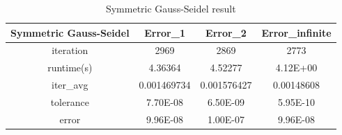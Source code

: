 \documentclass{article}
\begin{document}
\begin{table}[H]
  \centering
    \begin{tabular}{|c|c|c|c|}
    \hline
    \textbf{Symmetric Gauss-Seidel} & Error\_1 & Error\_2 & Error\_infinite \bigstrut\\
    \hline
    iteration & 2969 & 2869 & 2773 \bigstrut\\
    \hline
    runtime(s) & 4.36364 & 4.52277 & 4.12E+00 \bigstrut\\
    \hline
    iter\_avg & 0.001469734 & 0.001576427 & 0.00148608 \bigstrut\\
    \hline
    tolerance & 7.70E-08 & 6.50E-09 & 5.95E-10 \bigstrut\\
    \hline
    error & 9.96E-08 & 1.00E-07 & 9.96E-08 \bigstrut\\
    \hline
    \end{tabular}%
  \caption{Symmetric Gauss-Seidel result}
  \label{tab:sgs}%
\end{table}%
\end{document}
